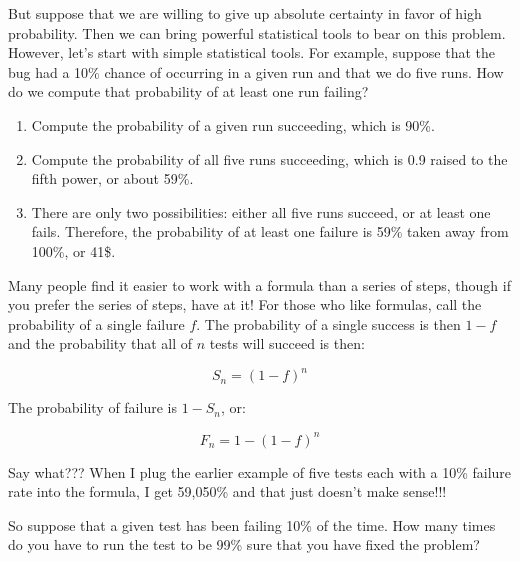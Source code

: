 But suppose that we are willing to give up absolute certainty in favor
of high probability.
Then we can bring powerful statistical tools to bear on this problem.
However, let's start with simple statistical tools.
For example, suppose that the bug had a 10\% chance of occurring in
a given run and that we do five runs.
How do we compute that probability of at least one run failing?

\begin{enumerate}
\item	Compute the probability of a given run succeeding, which is 90\%.
\item	Compute the probability of all five runs succeeding, which
	is 0.9 raised to the fifth power, or about 59\%.
\item	There are only two possibilities: either all five runs succeed,
	or at least one fails.
	Therefore, the probability of at least one failure is
	59\% taken away from 100\%, or 41\$.
\end{enumerate}

Many people find it easier to work with a formula than a series of steps,
though if you prefer the series of steps, have at it!
For those who like formulas, call the probability of a single failure $f$.
The probability of a single success is then $1-f$ and the probability
that all of $n$ tests will succeed is then:

\begin{equation}
	S_n = \left(1-f\right)^n
\end{equation}

The probability of failure is $1-S_n$, or:

\begin{equation}
	F_n = 1-\left(1-f\right)^n
\label{eq:debugging:Binomial Failure Rate}
\end{equation}

\QuickQuiz{}
	Say what???
	When I plug the earlier example of five tests each with a
	10\% failure rate into the formula, I get 59,050\% and that
	just doesn't make sense!!!
 \QuickQuizEnd

So suppose that a given test has been failing 10\% of the time.
How many times do you have to run the test to be 99\% sure that
you have fixed the problem?


